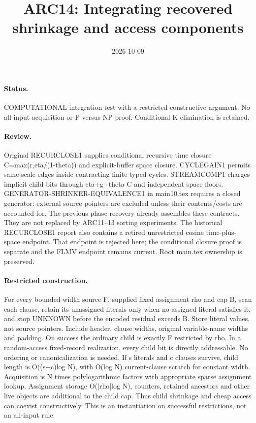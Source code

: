 \documentclass{article}
\title{ARC14: Integrating recovered shrinkage and access components}
\date{2026-10-09}
\begin{document}
\maketitle
\paragraph{Status.} COMPUTATIONAL integration test with a restricted constructive
argument. No all-input acquisition or P versus NP proof. Conditional K
elimination is retained.

\paragraph{Review.}
Original RECURCLOSE1 supplies conditional recursive time closure
C=max(r,eta/(1-theta)) and explicit-buffer space closure.
CYCLEGAIN1 permits same-scale edges inside contracting finite typed cycles.
STREAMCOMP1 charges implicit child bits through eta+g+theta C and independent
space floors. GENERATOR-SHRINKER-EQUIVALENCE1 in main10.tex requires a closed
generator: external source pointers are excluded unless their contents/costs
are accounted for. The previous phase recovery already assembles these
contracts. They are not replaced by ARC11--13 sorting experiments.
The historical RECURCLOSE1 report also contains a retired unrestricted
cosine time-plus-space endpoint. That endpoint is rejected here; the
conditional closure proof is separate and the FLMV endpoint remains current.
Root main.tex ownership is preserved.

\paragraph{Restricted construction.}
For every bounded-width source F, supplied fixed assignment rho and cap B,
scan each clause, retain its unassigned literals only when no assigned
literal satisfies it, and stop UNKNOWN before the encoded residual exceeds
B. Store literal values, not source pointers. Include header, clause widths,
original variable-name widths and padding.
On success the ordinary child is exactly F restricted by rho. In a
random-access fixed-record realization, every child bit is directly
addressable. No ordering or canonicalization is needed.
If s literals and c clauses survive, child length is
O((s+c)log N), with O(log N) current-clause scratch for constant width.
Acquisition is N times polylogarithmic factors with appropriate sparse
assignment lookup. Assignment storage O(|rho|log N), counters, retained
ancestors and other live objects are additional to the child cap.
Thus child shrinkage and cheap access can coexist constructively.
This is an instantiation on successful restrictions, not an all-input rule.
\end{document}
